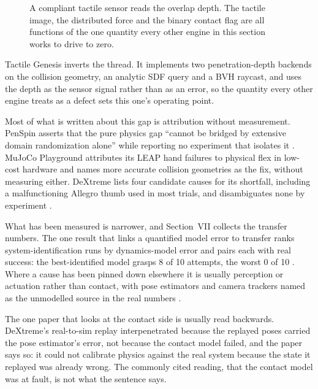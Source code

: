 \begin{figure}[!t] \centering
{}
\caption{A compliant tactile sensor reads the overlap depth. The tactile image, the distributed
force and the binary contact flag are all functions of the one quantity every other engine in
this section works to drive to zero.} \label{fig:tactiledepth} \end{figure}

Tactile Genesis inverts the thread. It implements two penetration-depth backends on the
collision geometry, an analytic SDF query and a BVH raycast, and uses the depth as the sensor
signal rather than as an error, so the quantity every other engine treats as a defect sets this
one's operating point.

\label{sec:sim:sim2real}
Most of what is written about this gap is attribution without measurement. PenSpin asserts that
the pure physics gap ``cannot be bridged by extensive domain randomization alone'' while reporting
no experiment that isolates it \cite{penspin_2024}. MuJoCo Playground attributes its LEAP hand
failures to physical flex in low-cost hardware and names more accurate collision geometries as the
fix, without measuring either. DeXtreme lists four candidate causes for its shortfall, including a
malfunctioning Allegro thumb used in most trials, and disambiguates none by experiment
\cite{dextreme_2022}.

What has been measured is narrower, and Section~VII collects the transfer numbers. The one
result that links a quantified model error to transfer ranks system-identification runs by
dynamics-model error and pairs each with real success: the best-identified model grasps 8 of 10
attempts, the worst 0 of 10 \cite[Table~1]{humanoid_sim2real_recipe_2025}. Where a cause has been
pinned down elsewhere it is usually perception or actuation rather than contact, with pose
estimators and camera trackers named as the unmodelled source in the real numbers
\cite[App.~C]{pddm_2019}.

The one paper that looks at the contact side is usually read backwards. DeXtreme's real-to-sim
replay interpenetrated because the replayed poses carried the pose estimator's error, not
because the contact model failed, and the paper says so: it could not calibrate physics against
the real system because the state it replayed was already wrong. The commonly cited reading,
that the contact model was at fault, is not what the sentence says.